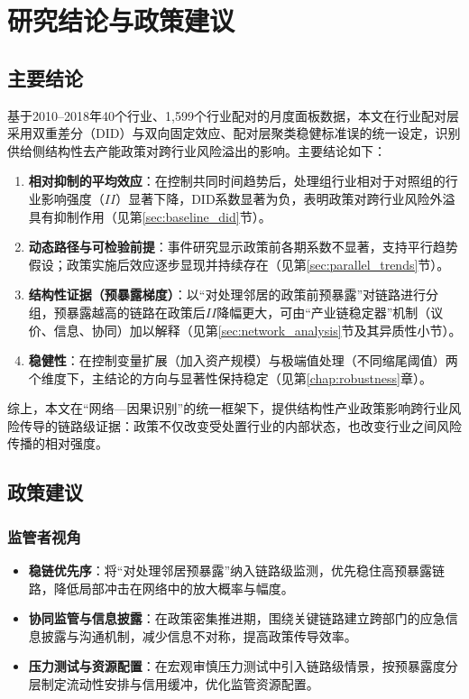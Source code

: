 \chapter{研究结论与政策建议}
\label{chap:conclusion}

\section{主要结论}
基于2010–2018年40个行业、1,599个行业配对的月度面板数据，本文在行业配对层采用双重差分（DID）与双向固定效应、配对层聚类稳健标准误的统一设定，识别供给侧结构性去产能政策对跨行业风险溢出的影响。主要结论如下：
\begin{enumerate}
  \item \textbf{相对抑制的平均效应}：在控制共同时间趋势后，处理组行业相对于对照组的行业影响强度（$II$）显著下降，DID系数显著为负，表明政策对跨行业风险外溢具有抑制作用（见第\ref{sec:baseline_did}节）。
  \item \textbf{动态路径与可检验前提}：事件研究显示政策前各期系数不显著，支持平行趋势假设；政策实施后效应逐步显现并持续存在（见第\ref{sec:parallel_trends}节）。
  \item \textbf{结构性证据（预暴露梯度）}：以“对处理邻居的政策前预暴露”对链路进行分组，预暴露越高的链路在政策后$II$降幅更大，可由“产业链稳定器”机制（议价、信息、协同）加以解释（见第\ref{sec:network_analysis}节及其异质性小节）。
  \item \textbf{稳健性}：在控制变量扩展（加入资产规模）与极端值处理（不同缩尾阈值）两个维度下，主结论的方向与显著性保持稳定（见第\ref{chap:robustness}章）。
\end{enumerate}

综上，本文在“网络—因果识别”的统一框架下，提供结构性产业政策影响跨行业风险传导的链路级证据：政策不仅改变受处置行业的内部状态，也改变行业之间风险传播的相对强度。

\section{政策建议}
\subsection{监管者视角}
\begin{itemize}
  \item \textbf{稳链优先序}：将“对处理邻居预暴露”纳入链路级监测，优先稳住高预暴露链路，降低局部冲击在网络中的放大概率与幅度。
  \item \textbf{协同监管与信息披露}：在政策密集推进期，围绕关键链路建立跨部门的应急信息披露与沟通机制，减少信息不对称，提高政策传导效率。
  \item \textbf{压力测试与资源配置}：在宏观审慎压力测试中引入链路级情景，按预暴露度分层制定流动性安排与信用缓冲，优化监管资源配置。
\end{itemize}

